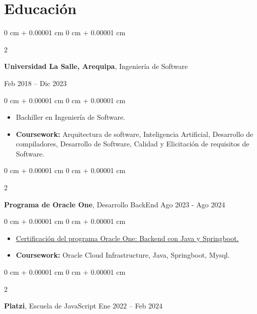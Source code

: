 \documentclass[10pt, letterpaper]{article}
\newenvironment{highlights}{
    \begin{itemize}[
        topsep=0.10 cm,
        parsep=0.10 cm,
        partopsep=0pt,
        itemsep=0pt,
        leftmargin=0 cm + 10pt
    ]
}{
    \end{itemize}
} %
\newenvironment{onecolentry}{
    \begin{adjustwidth}{
        0 cm + 0.00001 cm
    }{
        0 cm + 0.00001 cm
    }
}{
    \end{adjustwidth}
} %
\newenvironment{twocolentry}[2][]{
    \onecolentry
    \def\secondColumn{#2}
    \setcolumnwidth{\fill, 4.5 cm}
    \begin{paracol}{2}
}{
    \switchcolumn \raggedleft \secondColumn
    \end{paracol}
    \endonecolentry
} %
\begin{document}
   
    \section{Educación}
       
        \begin{twocolentry}{
            Feb 2018 – Dic 2023
        }
            \textbf{Universidad La Salle, Arequipa}, Ingeniería de Software
        \end{twocolentry}

        \vspace{0.10 cm}
        \begin{onecolentry}
            \begin{highlights}
                \item Bachiller en Ingeniería de Software.
                \item \textbf{Coursework:} Arquitectura de software, Inteligencia Artificial, Desarrollo de compiladores, Desarrollo de Software, Calidad y Elicitación de requisitos de Software. 
            \end{highlights}
        \end{onecolentry}
        \vspace{0.30 cm}

        \begin{twocolentry}{
            Ago 2023 - Ago 2024
        }
            \textbf{Programa de Oracle One}, Desarrollo BackEnd\end{twocolentry}

        \vspace{0.10 cm}
        \begin{onecolentry}
            \begin{highlights}
                \item \href{https://app.aluracursos.com/user/efren609/fullCertificate/124b1c05ec9e67541c81dad40a470321}{Certificación del programa Oracle One: Backend con Java y Springboot.} 
                \item \textbf{Coursework:} Oracle Cloud Infrastructure, Java, Springboot, Mysql.
            \end{highlights}
        \end{onecolentry}
        
        \vspace{0.30 cm}

        \begin{twocolentry}{
            Ene 2022 – Feb 2024
        }
            \textbf{Platzi}, Escuela de JavaScript\end{twocolentry}
\end{document}
